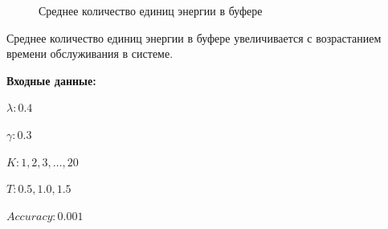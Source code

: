 \documentclass[12pt, a4paper]{article}
\begin{document}
\begin{figure}[h]
	\caption{Среднее количество единиц энергии в буфере}
	\label{ris3}
\end{figure}

Среднее количество единиц энергии в буфере увеличивается с возрастанием времени обслуживания в системе. 
\pagebreak

\textbf{Входные данные:}

$\lambda: 0.4$

$\gamma: 0.3$

$K: 1, 2, 3, \ldots, 20$

$T: 0.5, 1.0, 1.5$

$Accuracy: 0.001$
\end{document}
